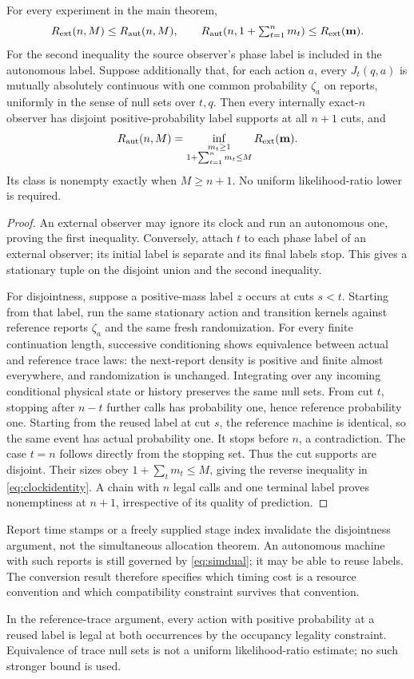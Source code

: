 \begin{proposition}\label{prop:clock}
For every experiment in the main theorem,
\begin{equation}\label{eq:conversion}
 R_{\mathrm{ext}}(n,M)\le R_{\mathrm{aut}}(n,M),\qquad
 R_{\mathrm{aut}}(n,1+\textstyle\sum_{t=1}^n m_t)\le R_{\mathrm{ext}}(\mathbf m).
\end{equation}
For the second inequality the source observer's phase label is included in the autonomous label. Suppose additionally that, for each action $a$, every $J_t(q,a)$ is mutually absolutely continuous with one common probability $\zeta_a$ on reports, uniformly in the sense of null sets over $t,q$. Then every internally exact-$n$ observer has disjoint positive-probability label supports at all $n+1$ cuts, and
\begin{equation}\label{eq:clockidentity}
 R_{\mathrm{aut}}(n,M)=
 \inf_{\substack{m_t\ge1\\1+\sum_{t=1}^n m_t\le M}} R_{\mathrm{ext}}(\mathbf m).
\end{equation}
Its class is nonempty exactly when $M\ge n+1$. No uniform likelihood-ratio lower is required.
\end{proposition}
\begin{proof}
An external observer may ignore its clock and run an autonomous one, proving the first inequality. Conversely, attach $t$ to each phase label of an external observer; its initial label is separate and its final labels stop. This gives a stationary tuple on the disjoint union and the second inequality.

For disjointness, suppose a positive-mass label $z$ occurs at cuts $s<t$. Starting from that label, run the same stationary action and transition kernels against reference reports $\zeta_a$ and the same fresh randomization. For every finite continuation length, successive conditioning shows equivalence between actual and reference trace laws: the next-report density is positive and finite almost everywhere, and randomization is unchanged. Integrating over any incoming conditional physical state or history preserves the same null sets. From cut $t$, stopping after $n-t$ further calls has probability one, hence reference probability one. Starting from the reused label at cut $s$, the reference machine is identical, so the same event has actual probability one. It stops before $n$, a contradiction. The case $t=n$ follows directly from the stopping set. Thus the cut supports are disjoint. Their sizes obey $1+\sum_tm_t\le M$, giving the reverse inequality in \eqref{eq:clockidentity}. A chain with $n$ legal calls and one terminal label proves nonemptiness at $n+1$, irrespective of its quality of prediction.
\end{proof}
Report time stamps or a freely supplied stage index invalidate the disjointness argument, not the simultaneous allocation theorem. An autonomous machine with such reports is still governed by \eqref{eq:simdual}; it may be able to reuse labels. The conversion result therefore specifies which timing cost is a resource convention and which compatibility constraint survives that convention.

In the reference-trace argument, every action with positive probability at a reused label is legal at both occurrences by the occupancy legality constraint. Equivalence of trace null sets is not a uniform likelihood-ratio estimate; no such stronger bound is used.
